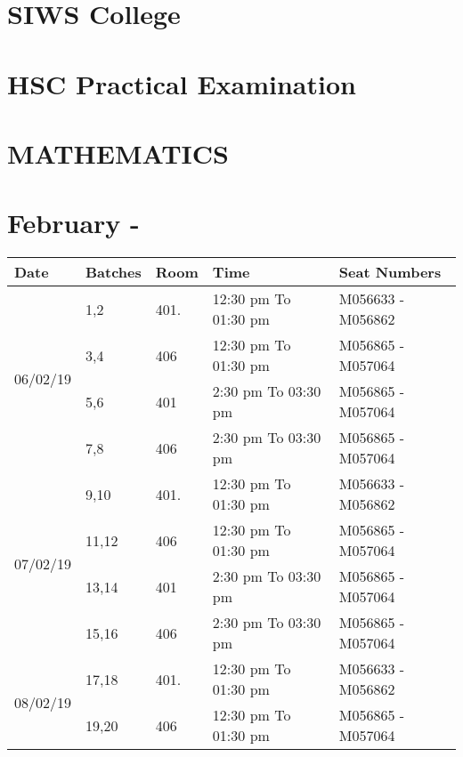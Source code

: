 \documentclass[17pt]{extarticle}
\begin{document}
\section*{SIWS College}
\section*{HSC Practical Examination }
\section*{MATHEMATICS}
\section*{February - \the\year }
\large
\begin{tabular}{ | m{3cm} | m{3cm}|m{3cm}| m{7cm} |  m{7.2cm} | } 
  \hline
  Date
  &Batches
  &Room
  &Time
  & Seat Numbers \\ 
  
   
  \hline
  \multirow{4}{*}{06/02/19 }
  &1,2
  &401.
  &12:30 pm To 01:30 pm 
  &M056633 - M056862 
  \\\cline{2-5}
  
  & 3,4
  &406
  & 12:30 pm To 01:30 pm
  & M056865 - M057064 
  \\\cline{2-5}
  
  & 5,6
  &401
  & 2:30 pm To 03:30 pm
  & M056865 - M057064 
  \\\cline{2-5}
  
  & 7,8
  &406
  & 2:30 pm To 03:30 pm
  & M056865 - M057064
  \\ 
  \hline


   
  
  \multirow{4}{*}{07/02/19 }
  &9,10
  &401.
  &12:30 pm To 01:30 pm 
  &M056633 - M056862 
  \\\cline{2-5}
  
  & 11,12
  &406
  & 12:30 pm To 01:30 pm
  & M056865 - M057064 
  \\\cline{2-5}
  
  & 13,14
  &401
  & 2:30 pm To 03:30 pm
  & M056865 - M057064 
  \\\cline{2-5}
  
  & 15,16
  &406
  & 2:30 pm To 03:30 pm
  & M056865 - M057064
  \\ 
  \hline

   
  
  \multirow{2}{*}{08/02/19 }
  &17,18
  &401.
  &12:30 pm To 01:30 pm 
  &M056633 - M056862 
  \\\cline{2-5}
  
  & 19,20
  &406
  & 12:30 pm To 01:30 pm
  & M056865 - M057064 
 \\ 
  \hline

   

\end{tabular}
\vspace{1.3cm}
\end{document}
